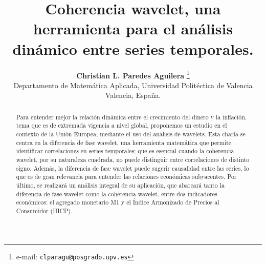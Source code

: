 \documentclass[11pt]{article}
\date{ }
\title{\header \textbf{Coherencia wavelet, una herramienta para el análisis dinámico entre series temporales.}}
\author{
%
\textbf{Christian L. Paredes Aguilera}%
\thanks{e-mail: \texttt{clparagu@posgrado.upv.es}}\\%
Departamento de Matemática Aplicada, Universidad Politéctica de Valencia\\ Valencia, España.
}
\begin{document}
\maketitle
\renewcommand\abstractname{Resumen}

\begin{abstract}


\noindent Para entender mejor la relación dinámica entre el crecimiento del dinero y la inflación, tema que es de extremada vigencia a nivel global, proponemos un estudio en el contexto de la Unión Europea, mediante el uso del análisis de wavelets. Esta charla se centra en la diferencia de fase wavelet, una herramienta matemática que permite identificar correlaciones en series temporales; que es esencial cuando la coherencia wavelet, por su naturaleza cuadrada, no puede distinguir entre correlaciones de distinto signo. Además, la diferencia de fase wavelet puede sugerir causalidad entre las series, lo que es de gran relevancia para entender las relaciones económicas subyacentes. Por último, se realizará un análisis integral de su aplicación, que abarcará tanto la diferencia de fase wavelet como la coherencia wavelet, entre dos indicadores económicos: el agregado monetario M1 y el Índice Armonizado de Precios al Consumidor (HICP).  

\end{abstract}
\end{document}
